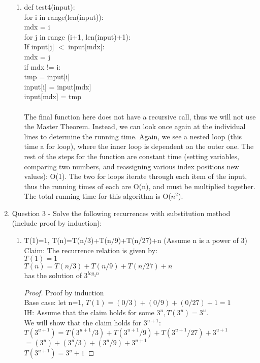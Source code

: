 \documentclass{article}
\begin{document}
\begin{enumerate}
\begin{enumerate}
        \item def test4(input):\\
        \indent for i in range(len(input)):\\
        \indent \indent mdx = i\\
        \indent \indent for j in range (i+1, len(input)+1):\\
        \indent \indent \indent If input[j] $<$ input[mdx]:\\
        \indent \indent \indent \indent mdx = j\\
        \indent \indent if mdx != i:\\
        \indent \indent \indent tmp = input[i]\\
        \indent \indent \indent input[i] = input[mdx]\\
        \indent \indent \indent input[mdx] = tmp\\\\
        The final function here does not have a recursive call, thus we will not use the Master Theorem.
        Instead, we can look once again at the individual lines to determine the running time. 
        Again, we see a nested loop (this time a for loop), where the inner loop is dependent on the outer one.
        The rest of the steps for the function are constant time (setting variables, comparing two numbers, and
        reassigning various index positions new values): O(1). The two for loops iterate through each item of the input,
        thus the running times of each are O(n), and must be multiplied together. The total running time for this
        algorithm is O($n^2$).\\

    \end{enumerate}
\item Question 3 - Solve the following recurrences with substitution method (include proof by induction):\\
  \begin{enumerate} 
  
        \item T(1)=1, T(n)=T(n/3)+T(n/9)+T(n/27)+n (Assume n is a power of 3)\\
        Claim: The recurrence relation is given by:\\
        $T(1)=1$\\
        $T(n) = T(n/3)+T(n/9)+T(n/27)+n$\\
        has the solution of $3^{log_3 n}$
        
        \begin{proof} Proof by induction\\
          Base case: let n=1, $T(1)=(0/3)+(0/9)+(0/27)+1=1$ \\
          IH: Assume that the claim holds for some $3^u, T(3^u)=3^u$.\\
          We will show that the claim holds for $3^{u+1}$:\\
          $T(3^{u+1})=T(3^{u+1}/3)+T(3^{u+1}/9)+T(3^{u+1}/27)+3^{u+1}$\\
          $ = (3^u)+(3^u/3)+(3^u/9)+3^{u+1}$\\
          $ T(3^{u+1})= 3^u+1$


\end{proof}
\end{enumerate}
\end{enumerate}
\end{document}
